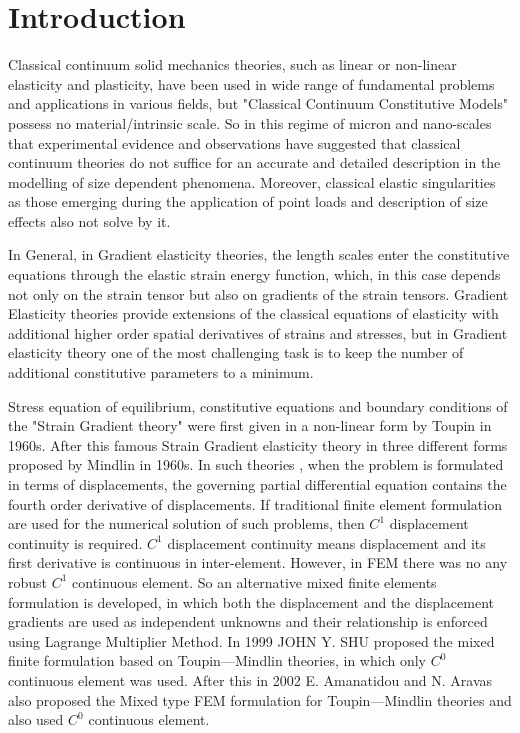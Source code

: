 \documentclass[12pt]{article}
\begin{document}
\section{Introduction}
Classical continuum solid mechanics theories, such as linear or non-linear elasticity and plasticity, have been used in wide range of fundamental problems and applications in various fields, but "Classical Continuum Constitutive Models" possess no material/intrinsic scale. So in this regime of micron and nano-scales that experimental evidence and observations have suggested that classical continuum theories do not suffice for an accurate and detailed description in the modelling of size dependent phenomena. Moreover, classical elastic singularities as those emerging during the application of point loads and description of size effects also not solve by it.
\newline
\par
In General, in Gradient elasticity theories, the length scales enter the constitutive equations through the elastic strain energy function, which, in this case depends not only on the strain tensor but also on gradients of the strain tensors. Gradient Elasticity theories provide extensions of the classical equations of elasticity with additional higher order spatial derivatives of strains and stresses, but in Gradient elasticity theory one of the most challenging task is to keep the number of additional constitutive parameters to a minimum.
\newline
\par
Stress equation of equilibrium, constitutive equations and boundary conditions of the "Strain Gradient theory" were first given in a non-linear form by Toupin in 1960s. After this famous Strain Gradient elasticity theory in three different forms proposed by Mindlin in 1960s. In such theories , when the problem is formulated in terms of displacements, the governing partial differential equation contains the fourth order derivative of displacements. If traditional finite element formulation are used for the numerical solution of such problems, then $C^{1}$ displacement continuity is required. $C^{1}$ displacement continuity means displacement and its first derivative is continuous in inter-element. However, in FEM there was no any robust $C^{1}$ continuous element. So an alternative mixed finite elements formulation is developed, in which both the displacement and the displacement gradients are used as independent unknowns and their relationship is enforced using Lagrange Multiplier Method. In 1999 JOHN Y. SHU proposed the mixed finite formulation based on Toupin—Mindlin theories, in which only $C^{0}$ continuous element was used. After this in 2002 E. Amanatidou and N. Aravas also proposed the Mixed type FEM formulation for Toupin—Mindlin theories and also used $C^{0}$ continuous element.
\end{document}
